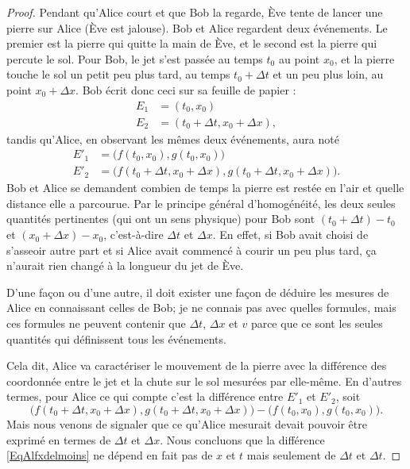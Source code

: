 \begin{proof}
Pendant qu'Alice court et que Bob la regarde, Ève tente de lancer une pierre sur Alice (Ève est jalouse). Bob et Alice regardent deux événements. Le premier est la pierre qui quitte la main de Ève, et le second est la pierre qui percute le sol. Pour Bob, le jet s'est passée au temps $t_0$ au point $x_0$, et la pierre touche le sol un petit peu plus tard, au temps $t_0+\Delta t$ et un peu plus loin, au point $x_0+\Delta x$. Bob écrit donc ceci sur sa feuille de papier :
\[
\begin{split}
E_1&=(t_0,x_0)\\
E_2&=(t_0+\Delta t,x_0+\Delta x),
\end{split}
\]
tandis qu'Alice, en observant les mêmes deux événements, aura noté
\[
\begin{split}
E'_1&=\big( f(t_0,x_0),g(t_0,x_0) \big) \\
E'_2&=\big( f(t_0+\Delta t,x_0+\Delta x), g(t_0+\Delta t,x_0+\Delta x) \big).
\end{split}
\]
Bob et Alice se demandent combien de temps la pierre est restée en l'air et quelle distance elle a parcourue. Par le principe général d'homogénéité, les deux seules quantités pertinentes (qui ont un sens physique) pour Bob sont $(t_0+\Delta t)-t_0$ et $(x_0+\Delta x)-x_0$, c'est-à-dire $\Delta t$ et $\Delta x$. En effet, si Bob avait choisi de s'asseoir autre part et si Alice avait commencé à courir un peu plus tard, ça n'aurait rien changé à la longueur du jet de Ève.

D'une façon ou d'une autre, il doit exister une façon de déduire les mesures de Alice en connaissant celles de Bob; je ne connais pas avec quelles formules, mais ces formules ne peuvent contenir que $\Delta t$, $\Delta x$ et $v$ parce que ce sont les seules quantités qui définissent tous les événements.

Cela dit, Alice va caractériser le mouvement de la pierre avec la différence des coordonnée entre le jet et la chute sur le sol mesurées par elle-même. En d'autres termes, pour Alice ce qui compte c'est la différence entre $E'_1$ et $E'_2$, soit
\begin{equation}	\label{EqAlfxdelmoins}
   \big( f(t_0+\Delta t,x_0+\Delta x), g(t_0+\Delta t,x_0+\Delta x) \big)-\big( f(t_0,x_0),g(t_0,x_0) \big).
\end{equation}
Mais nous venons de signaler que ce qu'Alice mesurait devait pouvoir être exprimé en termes de $\Delta t$ et $\Delta x$. Nous concluons que la différence \eqref{EqAlfxdelmoins} ne dépend en fait pas de $x$ et $t$ mais seulement de $\Delta t$ et $\Delta t$.


\end{proof}
